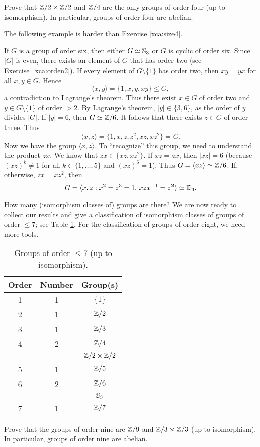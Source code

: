 \begin{exercise}
\label{xca:size4}
Prove that $\mathbb{Z}/2\times\mathbb{Z}/2$ and $\mathbb{Z}/4$ are 
the only groups of order four (up to isomorphism). In particular, 
groups of order four are abelian. 
\end{exercise}

The following example is harder than
Exercise \ref{xca:size4}.

\begin{example}
If $G$ is a group of order six, then
either $G\simeq\mathbb{S}_3$ or $G$ is cyclic of order six. 
Since $|G|$ is even, there exists an element of $G$ 
that has order two (see Exercise~\ref{xca:orden2}). 
If every element of $G\setminus\{1\}$ has order two, then
$xy=yx$ for all $x,y\in G$. Hence 
\[
\langle x,y\rangle=\{1,x,y,xy\}\leq G,
\]
a contradiction to Lagrange's theorem. Thus there exist 
$x\in G$ of order two 
and $y\in G\setminus\{1\}$ of order $>2$. 
By Lagrange's theorem, $|y|\in\{3,6\}$, 
as the order of $y$ divides $|G|$. If 
$|y|=6$, 
then $G\simeq\mathbb{Z}/6$. It follows that there exists 
$z\in G$ of order three. Thus 
\[
\langle x,z\rangle=\{1,x,z,z^2,xz,xz^2\}=G.
\]
Now we have the group $\langle x,z\rangle$. To ``recognize'' this group,
we need to understand the product $zx$. We know that
$zx\in\{xz,xz^2\}$. If $xz=zx$, then $|xz|=6$ (because
$(xz)^k\ne1$ for all $k\in\{1,\dots,5\}$ and
$(xz)^6=1$). Thus 
$G=\langle xz\rangle\simeq\mathbb{Z}/6$. If, otherwise, 
$zx=xz^2$, then 
\[
G=\langle x,z:x^2=z^3=1,\,xzx^{-1}=z^2\rangle\simeq\mathbb{D}_3.
\]
\end{example}

How many (isomorphism classes of) groups are there? We are now 
ready to collect our results and give a classification 
of isomorphism classes of groups of order $\leq7$; see
Table \ref{tab:grupos<8}. For the classification of groups
of order eight, we need more tools. 

\begin{table}[ht]
    \caption{Groups of order $\leq7$ (up to isomorphism).}

    \begin{tabular}{|c|c|c|}
    \hline
    Order & Number & Group(s)\\
    \hline
        1 & 1 & $\{1\}$ \\
        2 & 1 & $\mathbb{Z}/2$ \\
        3 & 1 & $\mathbb{Z}/3$ \\
        4 & 2 & $\mathbb{Z}/4$ \\
        && $\mathbb{Z}/2\times\mathbb{Z}/2$ \\
        5 & 1 & $\mathbb{Z}/5$ \\
        6 & 2 & $\mathbb{Z}/6$\\
        &&$\mathbb{S}_3$ \\
        7 & 1 & $\mathbb{Z}/7$ \\
    \hline
    \end{tabular}
    \label{tab:grupos<8}
\end{table}

\begin{exercise}
\label{xca:size9}
Prove that the groups of order nine are 
$\mathbb{Z}/9$ and $\mathbb{Z}/3\times\mathbb{Z}/3$ (up to isomorphism). In particular, groups of order
nine are abelian. 
\end{exercise}

